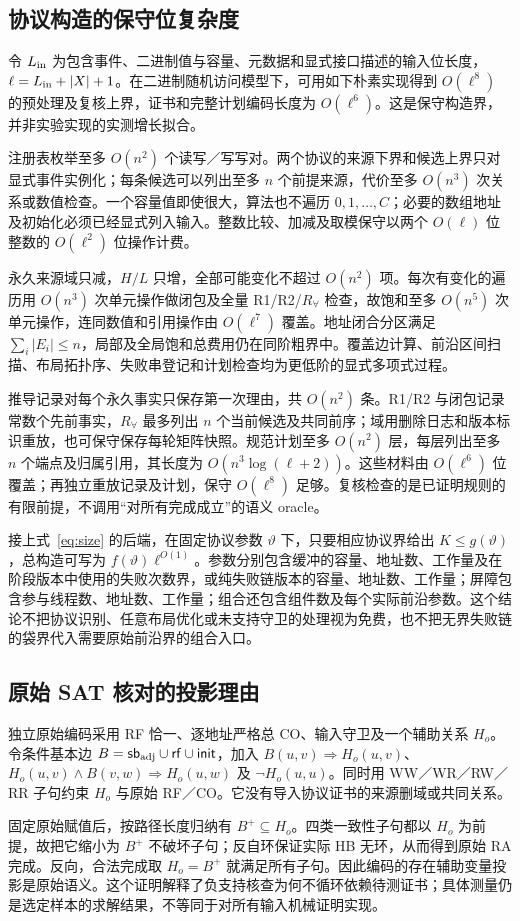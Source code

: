 \subsection{协议构造的保守位复杂度}\label{app:complexity}
令 $L_{\rm in}$ 为包含事件、二进制值与容量、元数据和显式接口描述的输入位长度，$\ell=L_{\rm in}+|X|+1$。在二进制随机访问模型下，可用如下朴素实现得到 $O(\ell^8)$ 的预处理及复核上界，证书和完整计划编码长度为 $O(\ell^6)$。这是保守构造界，并非实验实现的实测增长拟合。

注册表枚举至多 $O(n^2)$ 个读写／写写对。两个协议的来源下界和候选上界只对显式事件实例化；每条候选可以列出至多 $n$ 个前提来源，代价至多 $O(n^3)$ 次关系或数值检查。一个容量值即使很大，算法也不遍历 $0,1,\ldots,C$；必要的数组地址及初始化必须已经显式列入输入。整数比较、加减及取模保守以两个 $O(\ell)$ 位整数的 $O(\ell^2)$ 位操作计费。

永久来源域只减，$H/L$ 只增，全部可能变化不超过 $O(n^2)$ 项。每次有变化的遍历用 $O(n^3)$ 次单元操作做闭包及全量 R1/R2/$R_\forall$ 检查，故饱和至多 $O(n^5)$ 次单元操作，连同数值和引用操作由 $O(\ell^7)$ 覆盖。地址闭合分区满足 $\sum_i|E_i|\le n$，局部及全局饱和总费用仍在同阶粗界中。覆盖边计算、前沿区间扫描、布局拓扑序、失败串登记和计划检查均为更低阶的显式多项式过程。

推导记录对每个永久事实只保存第一次理由，共 $O(n^2)$ 条。R1/R2 与闭包记录常数个先前事实，$R_\forall$ 最多列出 $n$ 个当前候选及共同前序；域用删除日志和版本标识重放，也可保守保存每轮矩阵快照。规范计划至多 $O(n^2)$ 层，每层列出至多 $n$ 个端点及归属引用，其长度为 $O(n^3\log(\ell+2))$。这些材料由 $O(\ell^6)$ 位覆盖；再独立重放记录及计划，保守 $O(\ell^8)$ 足够。复核检查的是已证明规则的有限前提，不调用“对所有完成成立”的语义 oracle。

接上式~\eqref{eq:size} 的后端，在固定协议参数 $\vartheta$ 下，只要相应协议界给出 $K\le g(\vartheta)$，总构造可写为 $f(\vartheta)\ell^{O(1)}$。参数分别包含缓冲的容量、地址数、工作量及在阶段版本中使用的失败次数界，或纯失败链版本的容量、地址数、工作量；屏障包含参与线程数、地址数、工作量；组合还包含组件数及每个实际前沿参数。这个结论不把协议识别、任意布局优化或未支持守卫的处理视为免费，也不把无界失败链的袋界代入需要原始前沿界的组合入口。

\subsection{原始 SAT 核对的投影理由}\label{app:oracle}
独立原始编码采用 RF 恰一、逐地址严格总 CO、输入守卫及一个辅助关系 $H_o$。令条件基本边 $B=\mathsf{sb}_{\rm adj}\cup\mathsf{rf}\cup\mathsf{init}$，加入 $B(u,v)\Rightarrow H_o(u,v)$、$H_o(u,v)\land B(v,w)\Rightarrow H_o(u,w)$ 及 $\neg H_o(u,u)$。同时用 WW／WR／RW／RR 子句约束 $H_o$ 与原始 RF／CO。它没有导入协议证书的来源删域或共同关系。

固定原始赋值后，按路径长度归纳有 $B^+\subseteq H_o$。四类一致性子句都以 $H_o$ 为前提，故把它缩小为 $B^+$ 不破坏子句；反自环保证实际 HB 无环，从而得到原始 RA 完成。反向，合法完成取 $H_o=B^+$ 就满足所有子句。因此编码的存在辅助变量投影是原始语义。这个证明解释了负支持核查为何不循环依赖待测证书；具体测量仍是选定样本的求解结果，不等同于对所有输入机械证明实现。
